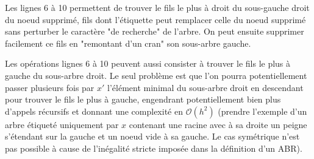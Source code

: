 \documentclass{scrartcl}
\begin{document}
			\rem Les lignes 6 à 10 permettent de trouver le fils le plus à droit du sous-gauche droit du noeud supprimé, 
				fils dont l'étiquette peut remplacer celle du noeud supprimé sans perturber le caractère "de recherche" de l'arbre.
				On peut ensuite supprimer facilement ce fils en "remontant d'un cran" son sous-arbre gauche.

			\rem Les opérations lignes 6 à 10 peuvent aussi consister à trouver le fils le plus à gauche du sous-arbre droit.
				Le seul problème est que l'on pourra potentiellement passer plusieurs fois par $x'$ l'élément minimal du sous-arbre droit en descendant pour trouver le fils le plus à gauche, engendrant potentiellement bien plus d'appels récursifs et donnant une complexité en $\mathcal{O}(h^2)$ (prendre l'exemple d'un arbre étiqueté uniquement par $x$ contenant une racine avec à sa droite un peigne s'étendant sur la gauche et un noeud vide à sa gauche. Le cas symétrique n'est pas possible à cause de l'inégalité stricte imposée dans la définition d'un ABR).
\end{document}
